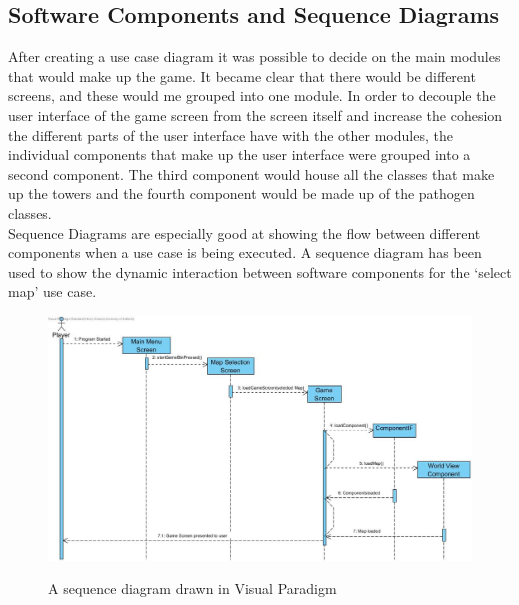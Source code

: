 \documentclass[a4paper,12pt]{article}
\begin{document}
\subsection*{Software Components and Sequence Diagrams}
After creating a use case diagram it was possible to decide on the main modules that would make up the game. It became clear that there would be different screens, and these would me grouped into one module. In order to decouple the user interface of the game screen from the screen itself and increase the cohesion the different parts of the user interface have with the other modules, the individual components that make up the user interface were grouped into a second component. The third component would house all the classes that make up the towers and the fourth component would be made up of the pathogen classes. 
\\
Sequence Diagrams are especially good at showing the flow between different components when a use case is being executed. A sequence diagram has been used to show the dynamic interaction between software components for the `select map' use case. 
\begin{figure}[h!]
	\begin{center}
		\includegraphics[width=12cm, origin=h]{images/Sequence-Diagram.jpg}
		\\
		\caption{A sequence diagram drawn in Visual Paradigm}
	\end{center}
\end{figure}
\end{document}
